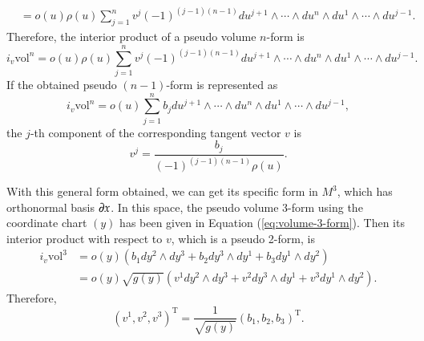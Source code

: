 \documentclass[11pt, a4paper]{book}
\begin{document}
\begin{enumerate}
\begin{align*}
    &= o(u) \rho(u) \sum_{j=1}^n v^j (-1)^{(j-1)(n-1)} du^{j+1} \wedge \cdots
      \wedge du^n \wedge du^1 \wedge \cdots \wedge du^{j-1}.
  \end{align*}
  Therefore, the interior product of a pseudo volume $n$-form is
  \begin{equation}
    \label{eq:interior-product-of-volume-form}
    i_v \mathrm{vol}^n = o(u) \rho(u) \sum_{j=1}^n v^j (-1)^{(j-1)(n-1)} du^{j+1} \wedge
    \cdots \wedge du^n \wedge du^1 \wedge \cdots \wedge du^{j-1}.
  \end{equation}
  If the obtained pseudo $(n-1)$-form is represented as
  \begin{equation}
    i_v \mathrm{vol}^n = o(u) \sum_{j=1}^n b_j du^{j+1} \wedge \cdots \wedge du^n \wedge
    du^1 \wedge \cdots \wedge du^{j-1},
  \end{equation}
  the $j$-th component of the corresponding tangent vector $v$ is
  \begin{equation}
    v^j = \frac{b_j}{(-1)^{(j-1)(n-1)} \rho(u)}.
  \end{equation}
  
  With this general form obtained, we can get its specific form in $M^3$, which has
  orthonormal basis $\boldsymbol{\partial}x$. In this space, the pseudo volume 3-form using the
  coordinate chart $(y)$ has been given in Equation (\ref{eq:volume-3-form}). Then its
  interior product with respect to $v$, which is a pseudo 2-form, is
  \begin{equation}
    \label{eq:interior-product-of-volume-form-in-3d}
    \begin{aligned}
      i_v \mathrm{vol}^3
      &= o(y) \left( b_1 dy^2 \wedge dy^3 + b_2 dy^3 \wedge dy^1 + b_3 dy^1 \wedge dy^2
      \right) \\
      &= o(y) \sqrt{g(y)} \left( v^1 dy^2 \wedge dy^3 + v^2 dy^3 \wedge dy^1 + v^3 dy^1
        \wedge dy^2 \right).
    \end{aligned}
  \end{equation}
  Therefore,
  \begin{equation}
    \label{eq:coeff-relation-between-2-form-and-vector}
    (v^1,v^2,v^3)^{\mathrm{T}} = \frac{1}{\sqrt{g(y)}} (b_1,b_2,b_3)^{\mathrm{T}}.
  \end{equation}
  

\end{enumerate}
\end{document}
